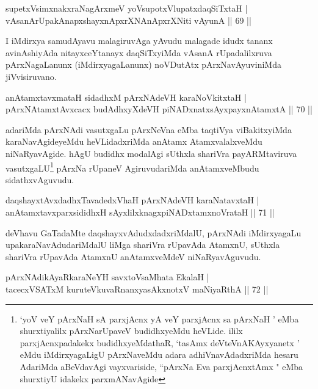 \begin{shl}
supetxV\s simxnakxraNagArxmeV yoV\s supotxV\s lupatxdaqSiTxtaH |\\
vAsanArUpakAnapxshayxnApxrXNAnApxrXNiti vAyunA \hfill || 69 ||
\end{shl}

\begin{artha}
I iMdirxya samudAyavu malagiruvAga yAvudu malagade idudx tananx avinAshiyAda nitayxceYtanayx daqSiTxyiMda vAsanA rUpadalilxruva pArxNagaLanunx (iMdirxyagaLanunx) noVDutAtx pArxNavAyuviniMda jiVvisiruvano.
\end{artha}

\begin{shl}
anAtamxtavxmataH sidadhxM pArxNAdeVH karaNoVkitxtaH |\\
pArxNAtamxtAvxcacx budAdhxyXdeVH piNADxnatxsAyxpayxnAtamxtA \hfill || 70 ||
\end{shl}

\begin{artha}
adariMda pArxNAdi vasutxgaLu pArxNeVna eMba taqtiVya viBakitxyiMda karaNavAgideyeMdu heVLidadxriMda anAtamx AtamxvalalxveMdu niNaRyavAgide. hAgU budidhx modalAgi sUthxla shariVra payARMtaviruva vasutxgaLU\footnote{`yoV veY pArxNaH sA parxjAcnx yA veY parxjAcnx sa pArxNaH ' eMba shurxtiyalilx pArxNarUpaveV budidhxyeMdu heVLide. ililx parxjAcnxpadakekx budidhxyeMdathaR, `tasAmx deVteVnAKAyxyanetx ' eMdu iMdirxyagaLigU pArxNaveMdu adara adhiVnavAdadxriMda hesaru AdariMda aBeVdavAgi vayxvariside, ``pArxNa Eva parxjAcnxtAmx " eMba shurxtiyU idakekx parxmANavAgide} pArxNa rUpaneV AgiruvudariMda anAtamxveMbudu sidathxvAguvudu.
\end{artha}%

\begin{shl}
daqshayxtAvxdadhxTavadedxVhaH pArxNAdeVH karaNatavxtaH |\\
anAtamxtavxparxsididhxH sAyxlilxknagxpiNADxtamxnoVrataH \hfill || 71 ||
\end{shl}

\begin{artha}
deVhavu GaTadaMte daqshayxvAdudxdadxriMdalU, pArxNAdi iMdirxyagaLu upakaraNavAdudariMdalU liMga shariVra rUpavAda AtamxnU, sUthxla shariVra rUpavAda AtamxnU anAtamxveMdeV niNaRyavAguvudu.
\end{artha}


\begin{shl}
pArxNAdikAyaRkaraNeYH savxtoV\s saMhata EkalaH |\\
tacecxVSATxM kuruteV\s kuvaRnanxyasAkxnotxV maNiyaRthA \hfill || 72 ||
\end{shl}	

